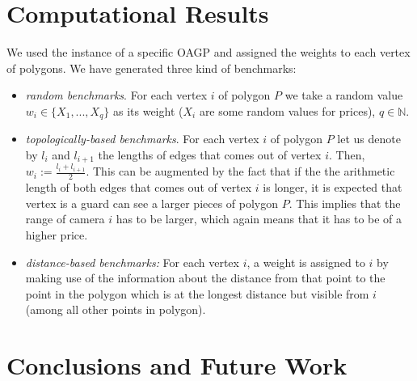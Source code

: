 \documentclass[runningheads,a4paper]{llncs}
\begin{document}
     \section{Computational Results}
       We used the instance of a specific OAGP and assigned the weights to each vertex of polygons. We have generated three kind of benchmarks:
       \begin{itemize}
       	  \item \emph{random benchmarks}. For each vertex $i$ of polygon $P$ we take a random value $w_i \in \{X_1,...,X_q\}$  as its weight ($X_i$ are some random values for prices), $q \in \mathbb{N}$.
       	  \item \emph{topologically-based benchmarks}. For each vertex $i$ of polygon $P$ let us denote by $l_i$ and $l_{i+1}$ the lengths of edges that comes out of vertex $i$. Then, $w_i := \frac{l_i + l_{i+1}}{2}$. This can be augmented by the fact that if the the arithmetic length of both edges that comes out of vertex $i$ is longer, it is expected that vertex is a guard can see a larger pieces of polygon $P$. This implies that the range of camera $i$ has to be larger, which again means that it has to be of a higher price.
       	 \item \emph{distance-based benchmarks:} For each vertex $i$, a weight is assigned to $i$ by making use of the information about the distance from that point to the point in the polygon which is at the longest distance but visible from $i$ (among all other points in polygon).  
       \end{itemize}
     \section{Conclusions and Future Work}



    
    
\end{document}
